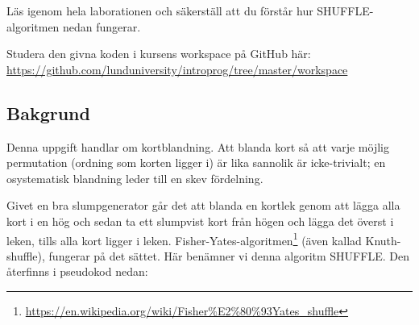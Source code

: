 

\Lab{\LabWeekSEVEN}

\begin{Goals}

\end{Goals}

\begin{Preparations}
\item {}
\item Läs igenom hela laborationen och säkerställ att du förstår hur SHUFFLE-algoritmen nedan fungerar.

\item Studera den givna koden i kursens workspace på GitHub här:\\
\url{https://github.com/lunduniversity/introprog/tree/master/workspace}

\end{Preparations}

\subsection{Bakgrund}\label{knuth-shuffle}

Denna uppgift handlar om kortblandning. Att blanda kort så att varje möjlig permutation (ordning som korten ligger i) är lika sannolik är icke-trivialt; en osystematisk blandning leder till en skev fördelning.

Givet en bra slumpgenerator går det att blanda en kortlek genom att lägga alla kort i en hög och sedan ta ett slumpvist kort från högen och lägga det överst i leken, tills alla kort ligger i leken. Fisher-Yates-algoritmen\footnote{\href{https://en.wikipedia.org/wiki/Fisher\%E2\%80\%93Yates_shuffle}{https://en.wikipedia.org/wiki/Fisher\%E2\%80\%93Yates\_shuffle}} (även kallad Knuth-shuffle), fungerar på det sättet. Här benämner vi denna algoritm SHUFFLE. Den återfinns i pseudokod nedan:

\begin{algorithm}[H]
\end{algorithm}

